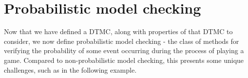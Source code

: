 \section{Probabilistic model checking}
\label{back:prob_mod_check}





Now that we have defined a DTMC, along with properties of that DTMC to consider, we now define probabilistic model checking - the class of methods for verifying the probability of some event occurring during the process of playing a game. Compared to non-probabilistic model checking, this presents some unique challenges, such as in the following example.

